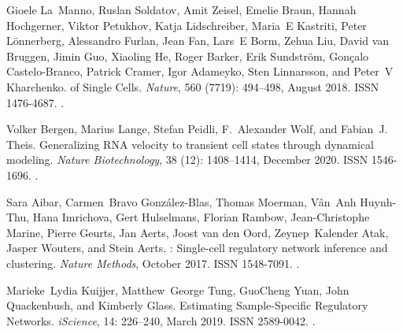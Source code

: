 \documentclass[10pt, a4paper]{article}
\begin{document}
\begin{thebibliography}{59}
	Gioele La~Manno, Ruslan Soldatov, Amit Zeisel, Emelie Braun, Hannah Hochgerner,
	Viktor Petukhov, Katja Lidschreiber, Maria~E Kastriti, Peter L{\"o}nnerberg,
	Alessandro Furlan, Jean Fan, Lars~E Borm, Zehua Liu, David {van Bruggen},
	Jimin Guo, Xiaoling He, Roger Barker, Erik Sundstr{\"o}m, Gon{\c c}alo
	{Castelo-Branco}, Patrick Cramer, Igor Adameyko, Sten Linnarsson, and Peter~V
	Kharchenko.
	 of {{Single Cells}}.
	\newblock \emph{Nature}, 560 (7719): 494--498, August 2018.
	\newblock ISSN 1476-4687.
	\newblock {}.
	
	Volker Bergen, Marius Lange, Stefan Peidli, F.~Alexander Wolf, and Fabian~J.
	Theis.
	\newblock Generalizing {{RNA}} velocity to transient cell states through
	dynamical modeling.
	\newblock \emph{Nature Biotechnology}, 38 (12): 1408--1414,
	December 2020.
	\newblock ISSN 1546-1696.
	\newblock {}.
	
	Sara Aibar, Carmen~Bravo {Gonz{\'a}lez-Blas}, Thomas Moerman, V{\^a}n~Anh
	{Huynh-Thu}, Hana Imrichova, Gert Hulselmans, Florian Rambow, Jean-Christophe
	Marine, Pierre Geurts, Jan Aerts, Joost {van den Oord}, Zeynep~Kalender Atak,
	Jasper Wouters, and Stein Aerts.
	: Single-cell regulatory network inference and clustering.
	\newblock \emph{Nature Methods}, October 2017.
	\newblock ISSN 1548-7091.
	\newblock {}.
	
	Marieke~Lydia Kuijjer, Matthew~George Tung, GuoCheng Yuan, John Quackenbush,
	and Kimberly Glass.
	\newblock Estimating {{Sample}}-{{Specific Regulatory Networks}}.
	\newblock \emph{iScience}, 14: 226--240, March 2019{}.
	\newblock ISSN 2589-0042.
	\newblock {}.
	

\end{thebibliography}
\end{document}
